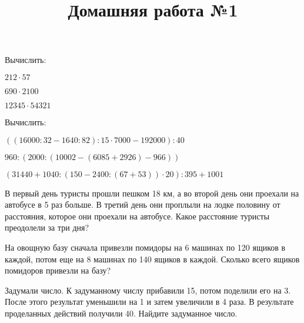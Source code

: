 \documentclass[12pt, a4paper]{article}
\begin{document}
\title{Домашняя работа №1}
\begin{enumcols}[label=\textbf{\arabic*.}]
	\item Вычислить:
	\begin{enumcols}[itemcolumns=3]
		\item \( 212\cdot57 \)
		\item \( 690\cdot2100 \)
		\item \( 12345\cdot54321 \)
	\end{enumcols}
	\item Вычислить:
	\begin{enumcols}[itemcolumns=1]
		\item \( ((16000:32-1640:82):15\cdot7000-192000):40 \)
		\item \( 960:(2000:(10002-(6085+2926)-966)) \)
		\item \( (31440+1040:(150-2400:(67+53))\cdot20):395+1001 \)
	\end{enumcols}
	\item В первый день туристы прошли пешком 18 км, а во второй день они проехали на автобусе в 5 раз больше. В третий день они проплыли на лодке половину от расстояния, которое они проехали на автобусе. Какое расстояние туристы преодолели за три дня?
	\item На овощную базу сначала привезли помидоры на 6 машинах по 120 ящиков в каждой, потом еще на 8 машинах по 140 ящиков в каждой. Сколько всего ящиков помидоров привезли на базу?
	\item Задумали число. К задуманному числу прибавили 15, потом поделили его на 3. После этого результат уменьшили на 1 и затем увеличили в 4 раза. В результате проделанных действий получили 40. Найдите задуманное число.
\end{enumcols}
\end{document}
